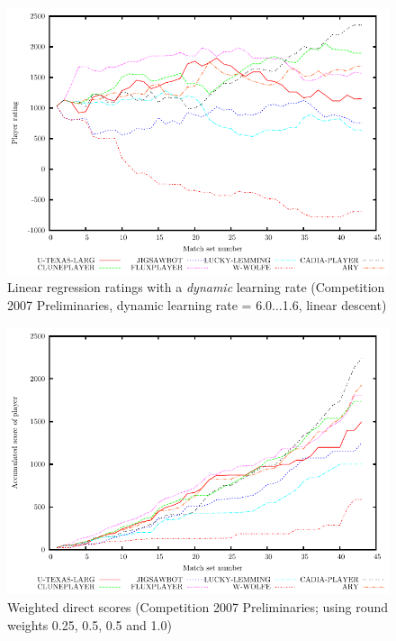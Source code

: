 \documentclass[a4paper,10pt]{article}
\begin{document}
\begin{figure}
 \centering
 \includegraphics[width=\textwidth]{dynamic_linear_regression_60}
 \caption{Linear regression ratings with a \textit{dynamic} learning rate
(Competition 2007 Preliminaries, dynamic learning rate = 6.0$\dotsc$1.6, linear
descent)}
 \label{fig:dynamic_linear_regression}
\end{figure}

\begin{figure}
 \centering
 \includegraphics[width=\textwidth]{direct_scores}
 \caption{Weighted direct scores (Competition 2007 Preliminaries; using round
weights 0.25, 0.5, 0.5 and 1.0)}
 \label{fig:direct_scores}
\end{figure}
\end{document}
